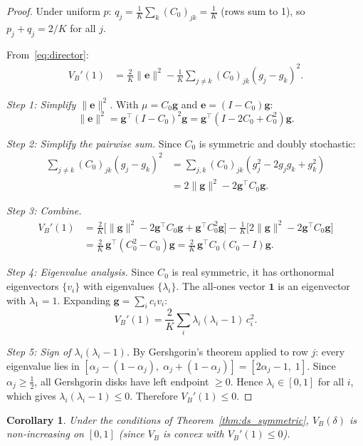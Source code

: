 \documentclass[11pt]{article}
\newtheorem{corollary}[theorem]{Corollary}
\begin{document}
\begin{proof}
Under uniform $p$: $q_j = \frac{1}{K}\sum_k (C_0)_{jk} = \frac{1}{K}$ (rows sum to 1), so $p_j + q_j = 2/K$ for all $j$.

From~\eqref{eq:director}:
\begin{align*}
  V_B'(1) &= \frac{2}{K}\|\mathbf{e}\|^2 - \frac{1}{K}\sum_{j\neq k}(C_0)_{jk}(g_j - g_k)^2.
\end{align*}

\emph{Step 1: Simplify $\|\mathbf{e}\|^2$.}
With $\mu = C_0\mathbf{g}$ and $\mathbf{e} = (I - C_0)\mathbf{g}$:
\[
  \|\mathbf{e}\|^2 = \mathbf{g}^\top(I-C_0)^2\mathbf{g} = \mathbf{g}^\top(I - 2C_0 + C_0^2)\mathbf{g}.
\]

\emph{Step 2: Simplify the pairwise sum.}
Since $C_0$ is symmetric and doubly stochastic:
\begin{align*}
  \sum_{j\neq k}(C_0)_{jk}(g_j-g_k)^2
  &= \sum_{j,k}(C_0)_{jk}(g_j^2 - 2g_jg_k + g_k^2) \\
  &= 2\|\mathbf{g}\|^2 - 2\mathbf{g}^\top C_0\mathbf{g}.
\end{align*}

\emph{Step 3: Combine.}
\begin{align*}
  V_B'(1) &= \frac{2}{K}\bigl[\|\mathbf{g}\|^2 - 2\mathbf{g}^\top C_0\mathbf{g} + \mathbf{g}^\top C_0^2\mathbf{g}\bigr]
             - \frac{1}{K}\bigl[2\|\mathbf{g}\|^2 - 2\mathbf{g}^\top C_0\mathbf{g}\bigr] \\
          &= \frac{2}{K}\,\mathbf{g}^\top(C_0^2 - C_0)\mathbf{g}
           = \frac{2}{K}\,\mathbf{g}^\top C_0(C_0 - I)\mathbf{g}.
\end{align*}

\emph{Step 4: Eigenvalue analysis.}
Since $C_0$ is real symmetric, it has orthonormal eigenvectors $\{v_i\}$ with eigenvalues $\{\lambda_i\}$.
The all-ones vector $\mathbf{1}$ is an eigenvector with $\lambda_1 = 1$.
Expanding $\mathbf{g} = \sum_i c_i v_i$:
\[
  V_B'(1) = \frac{2}{K}\sum_i \lambda_i(\lambda_i - 1)\,c_i^2.
\]

\emph{Step 5: Sign of $\lambda_i(\lambda_i - 1)$.}
By Gershgorin's theorem applied to row $j$: every eigenvalue lies in
$[\alpha_j - (1-\alpha_j),\; \alpha_j + (1-\alpha_j)] = [2\alpha_j - 1,\; 1]$.
Since $\alpha_j \geq \tfrac{1}{2}$, all Gershgorin disks have left endpoint $\geq 0$.
Hence $\lambda_i \in [0, 1]$ for all $i$, which gives $\lambda_i(\lambda_i - 1) \leq 0$.
Therefore $V_B'(1) \leq 0$.
\end{proof}

\begin{corollary}
Under the conditions of Theorem~\ref{thm:ds_symmetric},
$V_B(\delta)$ is non-increasing on $[0,1]$ (since $V_B$ is convex with $V_B'(1) \leq 0$).
\end{corollary}
\end{document}

